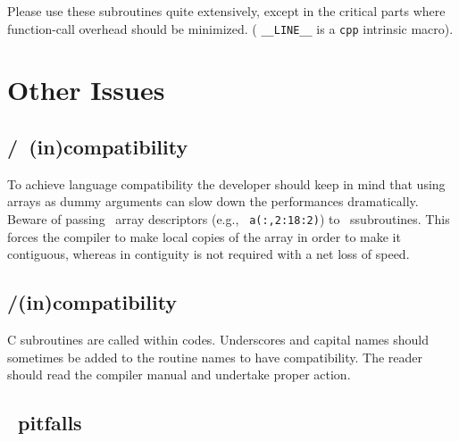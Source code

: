 Please use these subroutines quite extensively, except in the critical
parts where function-call overhead should be
minimized. (  \verb=__LINE__= is a  {\tt cpp}
intrinsic macro).


\section{Other Issues} 

\subsection{\fort/\oldfort\ (in)compatibility}

To achieve language compatibility the developer should keep in mind that
using arrays as dummy arguments can slow down the performances
dramatically. Beware of passing \fort\ array descriptors (e.g., {\tt
a(:,2:18:2)}) to \oldfort\ ssubroutines. This forces the \fort compiler to
make local copies of the array in order to make it contiguous, whereas in
\fort contiguity is not required with a net loss of speed.

\subsection{\fort/\C (in)compatibility}

C subroutines are called within \fort codes.  Underscores and
capital names should sometimes be added to the routine names to have
compatibility. The reader should read the compiler manual and undertake
proper action.
 

\subsection{\fort\ pitfalls}


